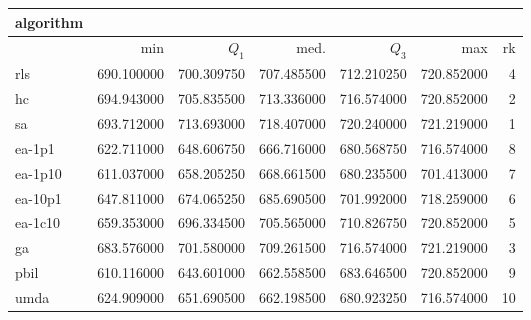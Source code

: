 \begin{tabular}{@{}l*{5}{>{{}}N{3}{2}}>{{}}N{2}{0}@{}}
\toprule
{algorithm} &  \\
\midrule
& {min} & {$Q_1$} & {med.} & {$Q_3$} & {max} & {rk}\\
\midrule
rls & 690.100000 & 700.309750 & 707.485500 & 712.210250 & 720.852000 & 4\\
hc & {\color{blue}} 694.943000 & 705.835500 & 713.336000 & 716.574000 & 720.852000 & 2\\
sa & 693.712000 & {\color{blue}} 713.693000 & {\color{blue}} 718.407000 & {\color{blue}} 720.240000 & {\color{blue}} 721.219000 & 1\\
ea-1p1 & 622.711000 & 648.606750 & 666.716000 & 680.568750 & 716.574000 & 8\\
ea-1p10 & 611.037000 & 658.205250 & 668.661500 & 680.235500 & 701.413000 & 7\\
ea-10p1 & 647.811000 & 674.065250 & 685.690500 & 701.992000 & 718.259000 & 6\\
ea-1c10 & 659.353000 & 696.334500 & 705.565000 & 710.826750 & 720.852000 & 5\\
ga & 683.576000 & 701.580000 & 709.261500 & 716.574000 & {\color{blue}} 721.219000 & 3\\
pbil & 610.116000 & 643.601000 & 662.558500 & 683.646500 & 720.852000 & 9\\
umda & 624.909000 & 651.690500 & 662.198500 & 680.923250 & 716.574000 & 10\\
\bottomrule
\end{tabular}

